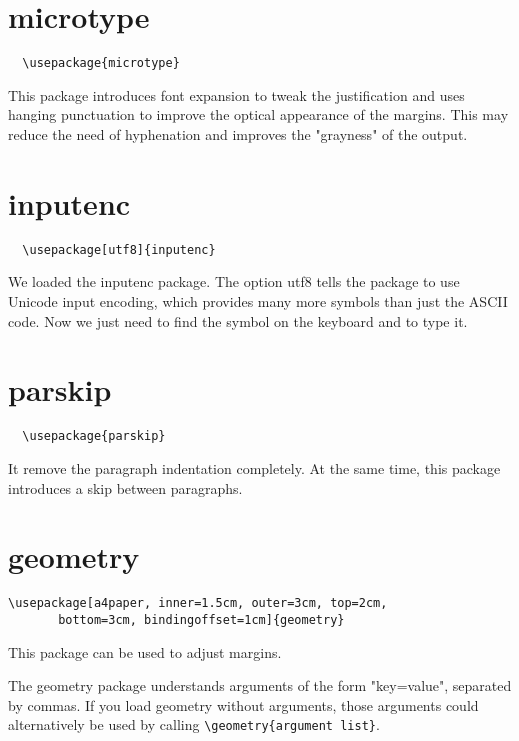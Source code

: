 \section{microtype}
\begin{lstlisting}
  \usepackage{microtype}
\end{lstlisting}

This package introduces font expansion to tweak the justification and uses hanging punctuation to improve the optical appearance of the margins. This may reduce the need of hyphenation and improves the "grayness" of the output.

\section{inputenc}
\begin{lstlisting}
  \usepackage[utf8]{inputenc}  
\end{lstlisting}

We loaded the inputenc package. The option utf8 tells the package to use Unicode input encoding, which provides many more symbols than just the ASCII code. Now we just need to find the symbol on the keyboard and to type it.


\section{parskip}
\begin{lstlisting}
  \usepackage{parskip}
\end{lstlisting}


It remove the paragraph indentation completely. At the same time, this package introduces a skip between paragraphs. 

\section{geometry}
\label{sec:geometry}
\begin{lstlisting}
\usepackage[a4paper, inner=1.5cm, outer=3cm, top=2cm,
       bottom=3cm, bindingoffset=1cm]{geometry}
\end{lstlisting}

This package can be used to adjust margins.

The geometry package understands arguments of the form "key=value", separated by commas.
If you load geometry without arguments, those arguments could alternatively be used by calling \lstinline|\geometry{argument list}|.


